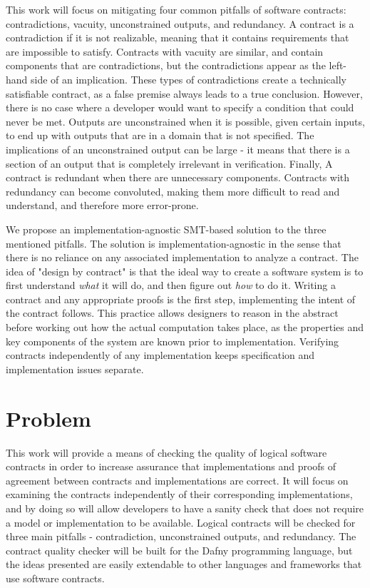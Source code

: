 \documentclass{article}
\begin{document}
This work will focus on mitigating four common pitfalls of software contracts: contradictions, vacuity, unconstrained
outputs, and redundancy. A contract is a contradiction if it is not realizable, meaning that it 
contains requirements that are impossible to satisfy. Contracts with vacuity are similar, and contain components that are contradictions, 
but the contradictions appear as the left-hand side of an implication. These types of contradictions create a technically satisfiable contract, as 
a false premise always leads to a true conclusion. However, there is no case where a developer would want to specify a condition that could 
never be met. Outputs are unconstrained when it is possible, given certain inputs, to end up with outputs that are in a domain that is not specified.
The implications of an unconstrained output can be large - it means that there is a section of an output that is
completely irrelevant in verification. Finally, A contract is redundant when there are unnecessary components. Contracts
with redundancy can become convoluted, making them more difficult to read and understand, and therefore more
error-prone.

We propose an implementation-agnostic SMT-based solution to the three mentioned pitfalls. The solution is implementation-agnostic in the sense
that there is no reliance on any associated implementation to analyze a contract. The idea of "design by contract" \cite{meyer1992applying} is that the 
ideal way to create a software system is to first understand {\it what} it will do, and then figure out {\it how} to do it. Writing a contract and 
any appropriate proofs is the first step, implementing the intent of the contract follows. This practice allows designers to reason in the abstract 
before working out how the actual computation takes place, as the properties and key components of the system are known prior to implementation. 
Verifying contracts independently of any implementation keeps specification and implementation issues separate. 

\section{Problem}

This work will provide a means of checking the quality of logical software contracts in order to increase assurance
that implementations and proofs of agreement between contracts and implementations are correct. It will focus on
examining the contracts independently of their corresponding implementations, and by doing so will allow developers
to have a sanity check that does not require a model or implementation to be available. Logical contracts will be
checked for three main pitfalls - contradiction, unconstrained outputs, and redundancy. The contract quality checker
will be built for the Dafny programming language, but the ideas presented are easily extendable to other languages
and frameworks that use software contracts. 
\end{document}
